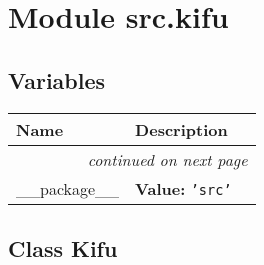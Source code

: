 %
%
%


\section{Module src.kifu}

    \label{src:kifu}


  \subsection{Variables}

    \vspace{-1cm}
\hspace{\varindent}\begin{longtable}{|p{\varnamewidth}|p{\vardescrwidth}|l}
\cline{1-2}
\cline{1-2} \centering \textbf{Name} & \centering \textbf{Description}& \\
\cline{1-2}
\endhead\cline{1-2}\multicolumn{3}{r}{\small\textit{continued on next page}}\\\endfoot\cline{1-2}
\endlastfoot\raggedright \_\-\_\-p\-a\-c\-k\-a\-g\-e\-\_\-\_\- & \raggedright \textbf{Value:} 
{\tt \texttt{'}\texttt{src}\texttt{'}}&\\
\cline{1-2}
\end{longtable}



\subsection{Class Kifu}

